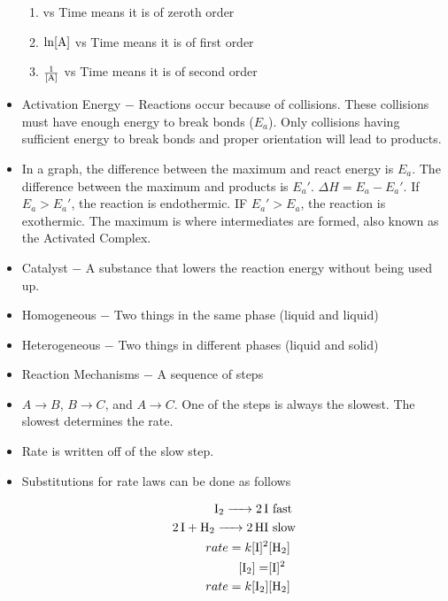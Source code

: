 \documentclass[12pt]{article}
\begin{document}
\begin{itemize}
    \begin{enumerate}

      \item [\ce{A}] vs Time means it is of zeroth order

      \item $\ln[\ce{A}]$ vs Time means it is of first order

      \item $\frac{1}{[\ce{A}]}$ vs Time means it is of second order

    \end{enumerate}

  \item Activation Energy $-$ Reactions occur because of collisions. These collisions must have enough energy to break bonds ($E_a$). Only collisions having sufficient energy to break bonds and proper orientation will lead to products.

  \item In a graph, the difference between the maximum and react energy is $E_a$. The difference between the maximum and products is $E_a'$. $\Delta H = E_a - E_a'$. If $E_a > E_a'$, the reaction is endothermic. IF $E_a' > E_a$, the reaction is exothermic. The maximum is where intermediates are formed, also known as the Activated Complex.

  \item Catalyst $-$ A substance that lowers the reaction energy without being used up.

  \item Homogeneous $-$ Two things in the same phase (liquid and liquid)

  \item Heterogeneous $-$ Two things in different phases (liquid and solid)

  \item Reaction Mechanisms $-$ A sequence of steps

  \item $A\rightarrow B$, $B\rightarrow C$, and $A\rightarrow C$. One of the steps is always the slowest. The slowest determines the rate.

  \item Rate is written off of the slow step.

  \item Substitutions for rate laws can be done as follows

    \begin{equation}
      \begin{split}
        \ce{I2 -> 2I} & \text{ fast}\\
        \ce{2I + H2 -> 2HI} & \text{ slow}\\
        rate=k[\ce{I}]^2&[\ce{H2}]\\
      [\ce{I2}] = &[\ce{I}]^2\\
        rate=k[\ce{I2}]&[\ce{H2}]\\
      \end{split}
      \label{3}
    \end{equation}

\end{itemize}
\end{document}
